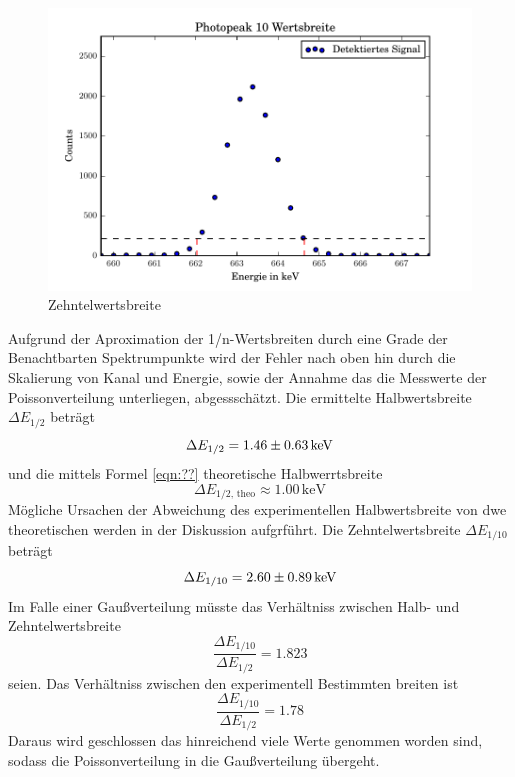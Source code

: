 \begin{figure}[h]
  \centering
  \includegraphics[width=\textwidth]{./build/10Wertsbreite.pdf}
  \caption{Zehntelwertsbreite}
  \label{fig:Zehntel}
\end{figure}
Aufgrund der Aproximation der 1/n-Wertsbreiten durch eine Grade der Benachtbarten Spektrumpunkte wird der Fehler nach oben hin durch die Skalierung von Kanal und Energie, sowie der Annahme das die Messwerte der Poissonverteilung unterliegen, abgessschätzt. Die ermittelte Halbwertsbreite $\Delta E_{1/2}$ beträgt
\begin{equation}
  \Delta E_{1/2} = \num{1.46 +- 0.63} \, \text{keV}
\end{equation}
und die mittels Formel \ref{eqn:??} theoretische Halbwerrtsbreite
\begin{equation}
  \Delta E_{1/2 \text{, theo}} \approx 1.00 \, \text{keV}
  \label{eqn:HalbTheo}
\end{equation}
Mögliche Ursachen der Abweichung des experimentellen Halbwertsbreite von dwe theoretischen werden in der Diskussion aufgrführt. Die Zehntelwertsbreite $\Delta E_{1/10}$ beträgt
\begin{equation}
  \Delta E_{1/10} = \num{2.60 +- 0.89} \, \text{keV}
\end{equation}
Im Falle einer Gaußverteilung müsste das Verhältniss zwischen Halb- und Zehntelwertsbreite
\begin{equation}
  \frac{\Delta E_{1/10}}{\Delta E_{1/2}} = 1.823 
\end{equation}
seien. Das Verhältniss zwischen den experimentell Bestimmten breiten ist
\begin{equation}
  \frac{\Delta E_{1/10}}{\Delta E_{1/2}} = 1.78 
  \label{eqn:Ver}
\end{equation}
Daraus wird geschlossen das hinreichend viele Werte genommen worden sind, sodass die Poissonverteilung in die Gaußverteilung übergeht.

